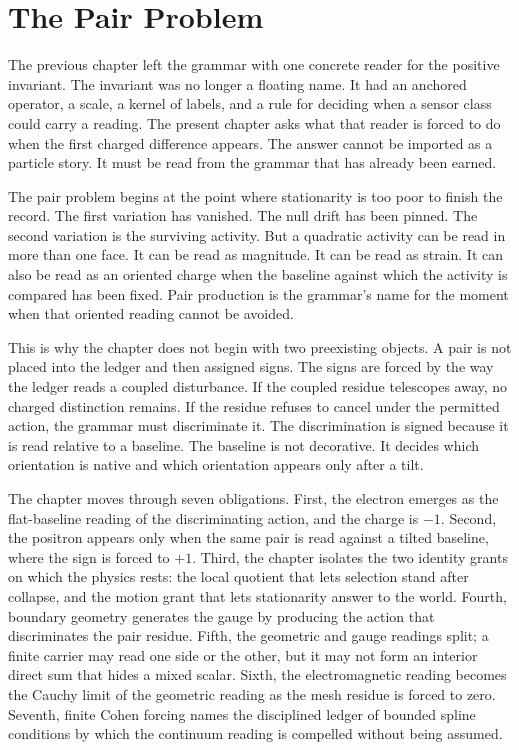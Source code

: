 \section{The Pair Problem}

The previous chapter left the grammar with one concrete reader for the
positive invariant. The invariant was no longer a floating name. It had an
anchored operator, a scale, a kernel of labels, and a rule for deciding when a
sensor class could carry a reading. The present chapter asks what that
reader is forced to do when the first charged difference appears. The answer
cannot be imported as a particle story. It must be read from the grammar that
has already been earned.

The pair problem begins at the point where stationarity is too poor to
finish the record. The first variation has vanished. The null drift has been
pinned. The second variation is the surviving activity. But a quadratic
activity can be read in more than one face. It can be read as magnitude. It
can be read as strain. It can also be read as an oriented charge when the
baseline against which the activity is compared has been fixed. Pair
production is the grammar's name for the moment when that oriented reading
cannot be avoided.

This is why the chapter does not begin with two preexisting objects. A pair
is not placed into the ledger and then assigned signs. The signs are forced
by the way the ledger reads a coupled disturbance. If the coupled residue
telescopes away, no charged distinction remains. If the residue refuses to
cancel under the permitted action, the grammar must discriminate it. The
discrimination is signed because it is read relative to a baseline. The
baseline is not decorative. It decides which orientation is native and which
orientation appears only after a tilt.

The chapter moves through seven obligations. First, the electron emerges as
the flat-baseline reading of the discriminating action, and the charge is
\(-1\). Second, the positron appears only when the same pair is read against
a tilted baseline, where the sign is forced to \(+1\). Third, the chapter
isolates the two identity grants on which the physics rests: the local
quotient that lets selection stand after collapse, and the motion grant that
lets stationarity answer to the world. Fourth, boundary geometry generates
the gauge by producing the action that discriminates the pair residue. Fifth,
the geometric and gauge readings split; a finite carrier may read one side or
the other, but it may not form an interior direct sum that hides a mixed
scalar. Sixth, the electromagnetic reading becomes the Cauchy limit of the
geometric reading as the mesh residue is forced to zero. Seventh, finite
Cohen forcing names the disciplined ledger of bounded spline conditions by
which the continuum reading is compelled without being assumed.


